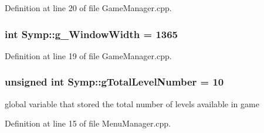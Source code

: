 Definition at line 20 of file Game\-Manager.\-cpp.

\hypertarget{namespace_symp_a13b9ebf55d22fb1ad248558acfd4cec6}{
\subsubsection[{g\-\_\-\-Window\-Width}]{\setlength{\rightskip}{0pt plus 5cm}int Symp\-::g\-\_\-\-Window\-Width = 1365}}\label{namespace_symp_a13b9ebf55d22fb1ad248558acfd4cec6}


Definition at line 19 of file Game\-Manager.\-cpp.

\hypertarget{namespace_symp_a350b1cbffd0ded84bd0f5bb28bf9abe4}{
\subsubsection[{g\-Total\-Level\-Number}]{\setlength{\rightskip}{0pt plus 5cm}unsigned int Symp\-::g\-Total\-Level\-Number = 10}}\label{namespace_symp_a350b1cbffd0ded84bd0f5bb28bf9abe4}
global variable that stored the total number of levels available in game 

Definition at line 15 of file Menu\-Manager.\-cpp.

